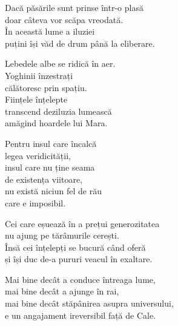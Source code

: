 Dacă păsările sunt prinse într-o plasă\\
doar câteva vor scăpa vreodată.\\
În această lume a iluziei\\
puțini își văd de drum până la eliberare.


Lebedele albe se ridică în aer.\\
Yoghinii înzestrați\\
călătoresc prin spațiu.\\
Ființele înțelepte\\
transcend deziluzia lumească\\
amăgind hoardele lui Mara.


Pentru insul care încalcă\\
legea veridicității,\\
insul care nu ține seama\\
de existența viitoare,\\
nu există niciun fel de rău\\
care e imposibil.


Cei care eșuează în a prețui generozitatea\\
nu ajung pe tărâmurile cerești.\\
Însă cei înțelepți se bucură când oferă\\
și își duc de-a pururi veacul în exaltare.


Mai bine decât a conduce întreaga lume,\\
mai bine decât a ajunge în rai,\\
mai bine decât stăpânirea asupra universului,\\
e un angajament ireversibil față de Cale.
